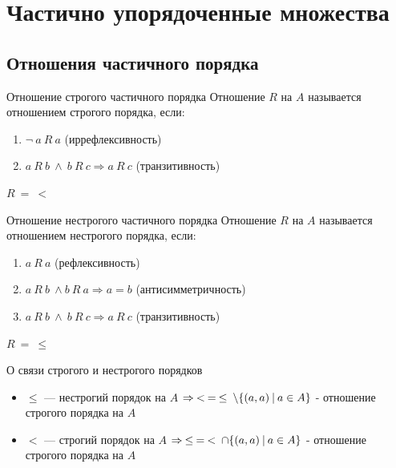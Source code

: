 \section{Частично упорядоченные множества}

\subsection{Отношения частичного порядка}

\begin{defn}{Отношение строгого частичного порядка}{}
    Отношение \( R \) на \( A \) называется отношением строгого порядка, если:
    \begin{enumerate}
        \item
            \( \lnot \ a \ R \ a \) (иррефлексивность)
        \item
            \( a \ R \ b \ \land \ b \ R \ c \Rightarrow a \ R \ c \) (транзитивность)
    \end{enumerate}

    \( R \: = \: < \)
\end{defn}

\begin{defn}{Отношение нестрогого частичного порядка}{}
    Отношение \( R \) на \( A \) называется отношением нестрогого порядка, если:
    \begin{enumerate}
        \item
            \( a \ R \ a \) (рефлексивность)
        \item
            \( a \ R \ b \ \land b \ R \ a \Rightarrow a = b \) (антисимметричность)
        \item
            \( a \ R \ b \ \land \ b \ R \ c \Rightarrow a \ R \ c \) (транзитивность)
    \end{enumerate}

    \( R \: = \: \leq \)
\end{defn}

\begin{lemma}{О связи строгого и нестрогого порядков}{}
    \begin{itemize}
        \item
            \( \leq \) --- нестрогий порядок на \( A \)
            \( \Rightarrow \: < \: = \: \leq \: \setminus \{ (a, a) \ \vline \ a \in A \} \)
            - отношение строгого порядка на \( A \)
        \item
            \( < \) --- строгий порядок на \( A \)
            \( \Rightarrow \: \leq \: = \: < \: \cap \{ (a, a) \ \vline \ a \in A \} \)
            - отношение строгого порядка на \( A \)
    \end{itemize}
\end{lemma}

